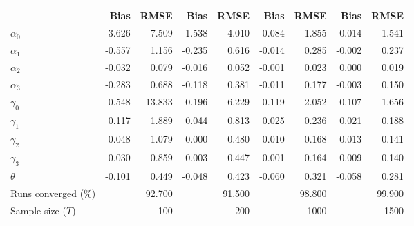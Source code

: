 
\begin{tabular}[t]{lrrrrrrrr}
\toprule
  & Bias & RMSE & Bias & RMSE & Bias & RMSE & Bias & RMSE\\
\midrule
$\alpha_{0}$ & -3.626 & 7.509 & -1.538 & 4.010 & -0.084 & 1.855 & -0.014 & 1.541\\
$\alpha_{1}$ & -0.557 & 1.156 & -0.235 & 0.616 & -0.014 & 0.285 & -0.002 & 0.237\\
$\alpha_{2}$ & -0.032 & 0.079 & -0.016 & 0.052 & -0.001 & 0.023 & 0.000 & 0.019\\
$\alpha_{3}$ & -0.283 & 0.688 & -0.118 & 0.381 & -0.011 & 0.177 & -0.003 & 0.150\\
$\gamma_{0}$ & -0.548 & 13.833 & -0.196 & 6.229 & -0.119 & 2.052 & -0.107 & 1.656\\
$\gamma_{1}$ & 0.117 & 1.889 & 0.044 & 0.813 & 0.025 & 0.236 & 0.021 & 0.188\\
$\gamma_{2}$ & 0.048 & 1.079 & 0.000 & 0.480 & 0.010 & 0.168 & 0.013 & 0.141\\
$\gamma_{3}$ & 0.030 & 0.859 & 0.003 & 0.447 & 0.001 & 0.164 & 0.009 & 0.140\\
$\theta$ & -0.101 & 0.449 & -0.048 & 0.423 & -0.060 & 0.321 & -0.058 & 0.281\\
Runs converged (\%) &  & 92.700 &  & 91.500 &  & 98.800 &  & 99.900\\
Sample size ($T$) &  & 100 &  & 200 &  & 1000 &  & 1500\\
\bottomrule
\end{tabular}
